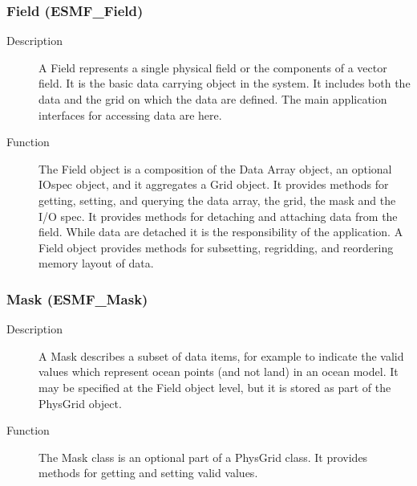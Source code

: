 \subsubsection{Field (ESMF\_Field)}
\label{sec:field} 
\begin{description} 
\item [Description] A Field represents a single physical field or the components of a 
vector field.  It is the basic data carrying object in the system.  It includes both
the data and the grid on which the data are defined.  The main application interfaces
for accessing data are here.
\item [Function] The Field object is a composition of the Data Array object,
an optional IOspec object, and it aggregates a Grid object.  It provides
methods for getting, setting, and querying the data array, the grid, the mask and
the I/O spec.  It provides methods for detaching and attaching data from the field.
While data are detached it is the responsibility of the application.  A Field object
provides methods for subsetting, regridding, and reordering memory layout of data.
\end{description}

\subsubsection{Mask (ESMF\_Mask)}
\label{sec:mask} 
\begin{description}
\item [Description] A Mask describes a subset of data items, for example to indicate
the valid values which represent ocean points (and not land) in an ocean model.  
It may be specified at the Field object level, but it is stored as part of the PhysGrid object.
\item [Function] The Mask class is an optional part of a PhysGrid class.  
It provides methods for getting and setting valid values.
\end{description}

